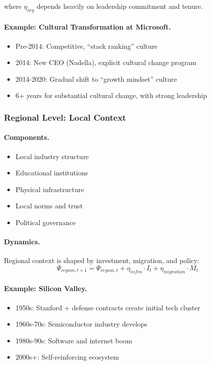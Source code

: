 \documentclass[12pt,a4paper]{article}
\begin{document}
where $\eta_{org}$ depends heavily on leadership commitment and tenure.

\paragraph{Example: Cultural Transformation at Microsoft.}
\begin{itemize}
  \item Pre-2014: Competitive, ``stack ranking'' culture
  \item 2014: New CEO (Nadella), explicit cultural change program
  \item 2014-2020: Gradual shift to ``growth mindset'' culture
  \item 6+ years for substantial cultural change, with strong leadership
\end{itemize}

\subsubsection{Regional Level: Local Context}

\paragraph{Components.}
\begin{itemize}
  \item Local industry structure
  \item Educational institutions
  \item Physical infrastructure
  \item Local norms and trust
  \item Political governance
\end{itemize}

\paragraph{Dynamics.}
Regional context is shaped by investment, migration, and policy:
\begin{equation}
  \Psi_{region, t+1} = \Psi_{region, t} + \eta_{infra} \cdot I_t + \eta_{migration} \cdot M_t
\end{equation}

\paragraph{Example: Silicon Valley.}
\begin{itemize}
  \item 1950s: Stanford + defense contracts create initial tech cluster
  \item 1960s-70s: Semiconductor industry develops
  \item 1980s-90s: Software and internet boom
  \item 2000s+: Self-reinforcing ecosystem
\end{itemize}
\end{document}
